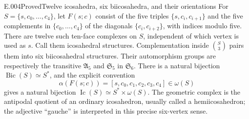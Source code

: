 \begin{saresult}{E.004}{Proved}{Twelve icosahedra, six biicosahedra, and their orientations}
For $S=\{s,c_0,\ldots,c_4\}$, let $F(s;c)$ consist of the five triples
$\{s,c_i,c_{i+1}\}$ and the five complements in $\{c_0,\ldots,c_4\}$
of the diagonals $\{c_i,c_{i+2}\}$, with indices modulo five.
There are twelve such ten-face complexes on $S$, independent of which
vertex is used as $s$. Call them icosahedral structures. Complementation
inside $\binom S3$ pairs them into six biicosahedral structures.
Their automorphism groups are respectively the transitive
$\mathfrak A_5$ and $\mathfrak S_5$ in $\mathfrak S_6$.
There is a natural bijection $\operatorname{Bic}(S)\simeq S^*$, and the
explicit convention
\[
 \alpha(F(s;c))=[s,c_0,c_1,c_2,c_3,c_4]\in\omega(S)
\]
gives a natural bijection
$\operatorname{Ic}(S)\simeq S^*\times\omega(S)$.
The geometric complex is the antipodal quotient of an ordinary
icosahedron, usually called a hemiicosahedron; the adjective ``gauche''
is interpreted in this precise six-vertex sense.
\end{saresult}
